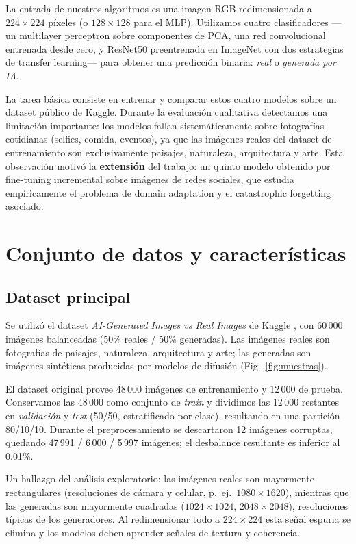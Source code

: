 \documentclass[conference]{IEEEtran}
\begin{document}
La entrada de nuestros algoritmos es una imagen RGB redimensionada a $224 \times 224$ píxeles (o $128 \times 128$ para el MLP). Utilizamos cuatro clasificadores —un multilayer perceptron sobre componentes de PCA, una red convolucional entrenada desde cero, y ResNet50 preentrenada en ImageNet con dos estrategias de transfer learning— para obtener una predicción binaria: \emph{real} o \emph{generada por IA}.

La tarea básica consiste en entrenar y comparar estos cuatro modelos sobre un dataset público de Kaggle. Durante la evaluación cualitativa detectamos una limitación importante: los modelos fallan sistemáticamente sobre fotografías cotidianas (selfies, comida, eventos), ya que las imágenes reales del dataset de entrenamiento son exclusivamente paisajes, naturaleza, arquitectura y arte. Esta observación motivó la \textbf{extensión} del trabajo: un quinto modelo obtenido por fine-tuning incremental sobre imágenes de redes sociales, que estudia empíricamente el problema de domain adaptation y el catastrophic forgetting asociado.

\section{Conjunto de datos y características}

\subsection{Dataset principal}

Se utilizó el dataset \emph{AI-Generated Images vs Real Images} de Kaggle \cite{kaggle-dataset}, con 60\,000 imágenes balanceadas (50\% reales / 50\% generadas). Las imágenes reales son fotografías de paisajes, naturaleza, arquitectura y arte; las generadas son imágenes sintéticas producidas por modelos de difusión (Fig.~\ref{fig:muestras}).

El dataset original provee 48\,000 imágenes de entrenamiento y 12\,000 de prueba. Conservamos las 48\,000 como conjunto de \emph{train} y dividimos las 12\,000 restantes en \emph{validación} y \emph{test} (50/50, estratificado por clase), resultando en una partición 80/10/10. Durante el preprocesamiento se descartaron 12 imágenes corruptas, quedando 47\,991 / 6\,000 / 5\,997 imágenes; el desbalance resultante es inferior al 0.01\%.

Un hallazgo del análisis exploratorio: las imágenes reales son mayormente rectangulares (resoluciones de cámara y celular, p.\ ej.\ $1080 \times 1620$), mientras que las generadas son mayormente cuadradas ($1024 \times 1024$, $2048 \times 2048$), resoluciones típicas de los generadores. Al redimensionar todo a $224 \times 224$ esta señal espuria se elimina y los modelos deben aprender señales de textura y coherencia.
\end{document}
